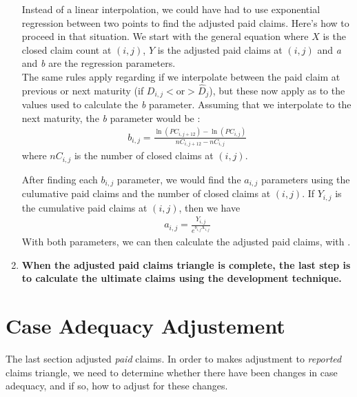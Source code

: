 \documentclass[11pt, english]{memoir}
\numberwithin{definition}{section}
\begin{document}
\begin{enumerate}
	
	Instead of a linear interpolation,  we could have had to use exponential regression between two points to find the adjusted paid claims. Here's how to proceed in that situation. We start with the general equation  where $ X $ is the closed claim count at $ (i,j) $, $ Y $ is the adjusted paid claims at $ (i,j) $ and \emph{a} and \emph{b} are the regression parameters. \\
	
	The same rules apply regarding if we interpolate between the paid claim at previous or next maturity (if $ D_{i,j} < \text{or} > \hat{D}_{j} $), but these now apply as to the values used to calculate the \emph{b} parameter. Assuming that we interpolate to the next maturity, the \emph{b} parameter would be : 
	\begin{align*}
	b_{i,j} = \frac{\ln(PC_{i, j+12}) - \ln(PC_{i, j})}{nC_{i, j + 12} - nC_{i,j}}
	\end{align*}
	where $ nC_{i,j} $ is the number of closed claims at $ (i,j) $. 
	
	After finding each $ b_{i,j} $ parameter, we would find the $ a_{i,j} $ parameters using the culumative paid claims and the number of closed claims at $ (i,j) $. If $ Y_{i,j} $ is the cumulative paid claims at $ (i,j) $, then we have 
	\begin{align*}
	a_{i,j} = \frac{Y_{i,j}}{e^{b_{i,j}X_{i,j}}}
	\end{align*}
 	With both parameters, we can then calculate the adjusted paid claims, with .\\
	
	
	\item \textbf{When the adjusted paid claims triangle is complete, the last step is to calculate the ultimate claims using the development technique.} 
	

	\end{enumerate}
	
 
	

	
	
	\section{Case Adequacy Adjustement}
	
	The last section adjusted \emph{paid} claims. In order to makes adjustment to \emph{reported} claims triangle, we need to determine whether there have been changes in case adequacy, and if so, how to adjust for these changes. 
\end{document}
